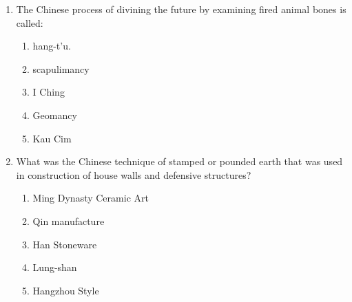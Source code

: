 \documentclass[12pt]{article}
\begin{document}
\begin{enumerate}[label=\arabic*.]
\item The Chinese process of divining the future by examining fired animal bones is called:
\begin{enumerate}[label=(\alph*)]
    \item hang-t'u.
    \item scapulimancy
    \item I Ching
    \item Geomancy
    \item Kau Cim
\end{enumerate}
\item What was the Chinese technique of stamped or pounded earth that was used in construction of house walls and defensive structures?
\begin{enumerate}[label=(\alph*)]
    \item Ming Dynasty Ceramic Art
    \item Qin manufacture
    \item Han Stoneware
    \item Lung-shan
    \item Hangzhou Style
\end{enumerate}
\end{enumerate}
\end{document}
